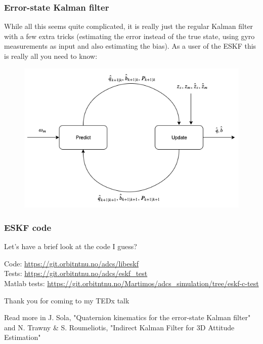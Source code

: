 \documentclass{beamer}
\begin{document}
\begin{frame}
    \frametitle{Error-state Kalman filter}
    While all this seems quite complicated, it is really just the regular Kalman filter with a few extra tricks (estimating the error instead of the true state, using gyro measurements as input and also estimating the bias). As a user of the ESKF this is really all you need to know:
    \begin{figure}
        \includegraphics[width=0.7\linewidth]{ESKF.png}
    \end{figure}
\end{frame}


\begin{frame}
    \frametitle{ESKF code}
    \large{\centerline{Let's have a brief look at the code I guess?}}
   \begin{center}
    \small{Code: \url{https://git.orbitntnu.no/adcs/libeskf} \\
    Tests: \url{https://git.orbitntnu.no/adcs/eskf_test} \\
    Matlab tests: \url{https://git.orbitntnu.no/Martimos/adcs_simulation/tree/eskf-c-test}}
   \end{center}
\end{frame}


\begin{frame}
\huge{\centerline{Thank you for coming to my TEDx talk}}
\begin{center}
\small{Read more in J. Sola, "Quaternion kinematics for the error-state Kalman filter" and N. Trawny \& S. Roumeliotis, "Indirect Kalman Filter for 3D Attitude Estimation"}
\end{center}
\end{frame}

\end{document}
